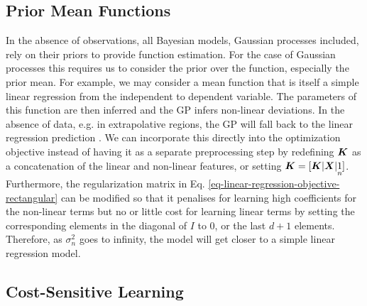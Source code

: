 \documentclass[useAMS,usenatbib,fleqn]{mn2e}
\begin{document}
\subsection{Prior Mean Functions}

In the absence of observations, all Bayesian models, Gaussian processes included, rely on their priors to provide function estimation. For the case of Gaussian processes this requires us to consider the prior over the function, especially the prior mean. For example, we may consider a mean function that is itself a simple linear regression from the independent to dependent variable. The parameters of this function are then inferred and the GP infers non-linear deviations. In the absence of data, e.g. in extrapolative regions, the GP will fall back to the linear regression prediction \citep{roberts2012rs}. We can incorporate this directly into the optimization objective instead of having it as a separate preprocessing step by redefining $\bmath{K}$ as a concatenation of the linear and non-linear features, or setting $\bmath{K}=[\bmath{K}|\bmath{X}|\underset{n}{1}]$. Furthermore, the regularization matrix in Eq. \eqref{eq-linear-regression-objective-rectangular} can be modified so that it penalises for learning high coefficients for the non-linear terms but no or little cost for learning linear terms by setting the corresponding elements in the diagonal of $I$ to 0, or the last $d+1$ elements. Therefore, as $\sigma_{n}^{2}$ goes to infinity, the model will get closer to a simple linear regression model.

\subsection{Cost-Sensitive Learning}
\end{document}
